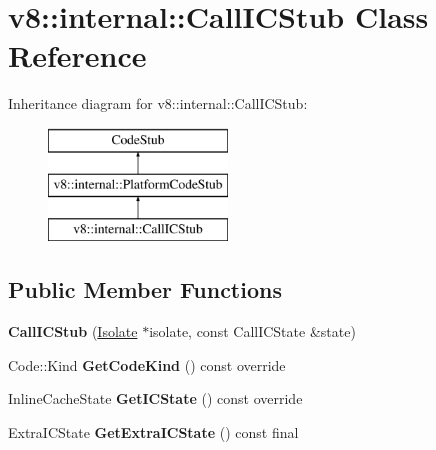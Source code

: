 \hypertarget{classv8_1_1internal_1_1_call_i_c_stub}{}\section{v8\+:\+:internal\+:\+:Call\+I\+C\+Stub Class Reference}
\label{classv8_1_1internal_1_1_call_i_c_stub}
Inheritance diagram for v8\+:\+:internal\+:\+:Call\+I\+C\+Stub\+:\begin{figure}[H]
\begin{center}
\leavevmode
\includegraphics[height=3.000000cm]{classv8_1_1internal_1_1_call_i_c_stub}
\end{center}
\end{figure}
\subsection*{Public Member Functions}
\begin{DoxyCompactItemize}
\item 
{\bfseries Call\+I\+C\+Stub} (\hyperlink{classv8_1_1internal_1_1_isolate}{Isolate} $\ast$isolate, const Call\+I\+C\+State \&state)\hypertarget{classv8_1_1internal_1_1_call_i_c_stub_a71e498f92cc4297b307bd901db2391cb}{}\label{classv8_1_1internal_1_1_call_i_c_stub_a71e498f92cc4297b307bd901db2391cb}

\item 
Code\+::\+Kind {\bfseries Get\+Code\+Kind} () const  override\hypertarget{classv8_1_1internal_1_1_call_i_c_stub_a7d074648a9895c67afd55edf34f14802}{}\label{classv8_1_1internal_1_1_call_i_c_stub_a7d074648a9895c67afd55edf34f14802}

\item 
Inline\+Cache\+State {\bfseries Get\+I\+C\+State} () const  override\hypertarget{classv8_1_1internal_1_1_call_i_c_stub_af41b57ca90a477d1d185490d963af5f6}{}\label{classv8_1_1internal_1_1_call_i_c_stub_af41b57ca90a477d1d185490d963af5f6}

\item 
Extra\+I\+C\+State {\bfseries Get\+Extra\+I\+C\+State} () const  final\hypertarget{classv8_1_1internal_1_1_call_i_c_stub_ae0c2b9860a2667797dac4329a7b4ada1}{}\label{classv8_1_1internal_1_1_call_i_c_stub_ae0c2b9860a2667797dac4329a7b4ada1}

\end{DoxyCompactItemize}
